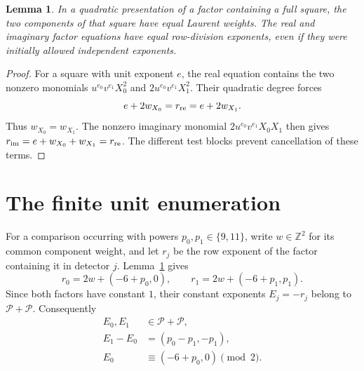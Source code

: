 \documentclass[11pt,a4paper]{article}
\newtheorem{lemma}[theorem]{Lemma}
\newcommand{\Z}{\mathbb Z}
\newcommand{\Pset}{\mathcal P}
\begin{document}
\begin{lemma}\label{lem:components}
In a quadratic presentation of a factor containing a full square,
the two components of that square have equal Laurent weights.
The real and imaginary factor equations have equal row-division
exponents, even if they were initially allowed independent exponents.
\end{lemma}
\begin{proof}
For a square with unit exponent $e$, the real equation contains
the two nonzero monomials
$u^{e_0}v^{e_1}X_0^2$ and
$2u^{e_0}v^{e_1}X_1^2$. Their quadratic degree forces
\[
                 e+2w_{X_0}=r_{\rm re}=e+2w_{X_1}.
\]
Thus $w_{X_0}=w_{X_1}$. The nonzero imaginary monomial
$2u^{e_0}v^{e_1}X_0X_1$ then gives
$r_{\rm im}=e+w_{X_0}+w_{X_1}=r_{\rm re}$.
The different test blocks prevent cancellation of these terms.
\end{proof}

\section{The finite unit enumeration}

For a comparison occurring with powers $p_0,p_1\in\{9,11\}$,
write $w\in\Z^2$ for its common component weight, and let $r_j$
be the row exponent of the factor containing it in detector $j$.
Lemma~\ref{lem:components} gives
\begin{equation}\label{eq:r}
 r_0=2w+(-6+p_0,0),\qquad
 r_1=2w+(-6+p_1,p_1).
\end{equation}
Since both factors have constant $1$, their constant exponents
$E_j=-r_j$ belong to $\Pset+\Pset$. Consequently
\begin{equation}\label{eq:filter}
\begin{split}
 E_0,E_1&\in\Pset+\Pset,\\
 E_1-E_0&=(p_0-p_1,-p_1),\\
 E_0&\equiv(-6+p_0,0)\pmod2.
\end{split}
\end{equation}
\end{document}
